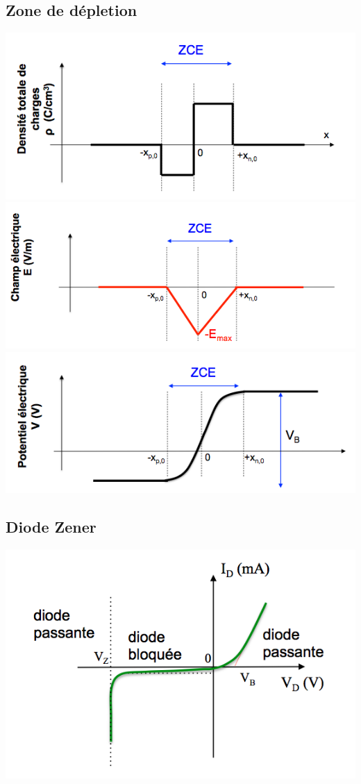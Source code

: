 \documentclass[]{article}
\begin{document}
\subsection{Zone de dépletion}
\includegraphics[scale=0.4]{dcharges}
\includegraphics[scale=0.4]{delec}
\includegraphics[scale=0.4]{pelec}

\subsection{Diode Zener}
\includegraphics[scale=0.8]{zener_IV.png} 
\end{document}
